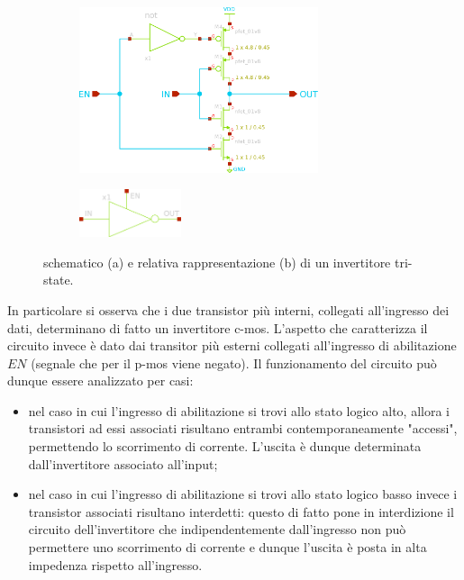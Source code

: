 	\begin{figure}[bht]
		\centering
		\begin{subfigure}{0.48\linewidth}
			\centering
			\includegraphics[width=7cm]{Immagini/tri-state-sch}
			\caption{}
		\end{subfigure}
		\begin{subfigure}{0.48\linewidth}
			\centering
			\includegraphics[width=3cm]{Immagini/tri-state-simple}
			\caption{}
		\end{subfigure}
		\caption{schematico (a) e relativa rappresentazione (b) di un invertitore tri-state.}
		\label{fig:tsi:sch}
	\end{figure}

	In particolare si osserva che i due transistor più interni, collegati all'ingresso dei dati, determinano di fatto un invertitore c-mos. L'aspetto che caratterizza il circuito invece è dato dai transitor più esterni collegati all'ingresso di abilitazione $EN$ (segnale che per il p-mos viene negato). Il funzionamento del circuito può dunque essere analizzato per casi:
	\begin{itemize}
		\item nel caso in cui l'ingresso di abilitazione si trovi allo stato logico alto, allora i transistori ad essi associati risultano entrambi contemporaneamente "accessi", permettendo lo scorrimento di corrente. L'uscita è dunque determinata dall'invertitore associato all'input;
		
		\item nel caso in cui l'ingresso di abilitazione si trovi allo stato logico basso invece i transistor associati risultano interdetti: questo di fatto pone in interdizione il circuito dell'invertitore che indipendentemente dall'ingresso non può permettere uno scorrimento di corrente e dunque l'uscita è posta in alta impedenza rispetto all'ingresso.
	\end{itemize}
	
